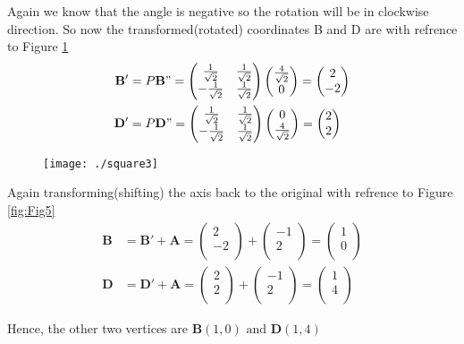 \documentclass[12pt]{article}
\newcommand{\myvec}[1]{\ensuremath{\begin{pmatrix}#1\end{pmatrix}}}
\let\vec\mathbf
\begin{document}
Again we know that the angle is negative so the rotation will be in clockwise direction. So now the transformed(rotated) coordinates B and D are with refrence to Figure \ref{fig:Fig4}
\begin{align*}
\vec{B'} &= P\vec{B"} = \myvec{
\frac{1}{\sqrt{2}} & \frac{1}{\sqrt{2}} \\
-\frac{1}{\sqrt{2}} & \frac{1}{\sqrt{2}}\\
}
\myvec{
 \frac{4}{\sqrt{2}}\\
 0\\
} = 
\myvec{
2 \\
-2\\
}\\
\vec{D'} &= P\vec{D"} = \myvec{
\frac{1}{\sqrt{2}} & \frac{1}{\sqrt{2}} \\
-\frac{1}{\sqrt{2}} & \frac{1}{\sqrt{2}}\\
}
\myvec{
 0\\
 \frac{4}{\sqrt{2}}\\
} = 
\myvec{
2 \\
2 \\
}
\end{align*}

\begin{figure}[!h]
	\begin{center} 
	    \texttt{[image: ./square3]}
	\end{center}
\caption{}
\label{fig:Fig4}
\end{figure}

Again transforming(shifting) the axis back to the original with refrence to Figure \ref{fig:Fig5}
\begin{align*}
\vec{B} &= \vec{B'}+\vec{A} = \myvec{
2 \\
-2\\
}+\myvec{
-1 \\
2\\
} = 
\myvec{
1 \\
0\\
}\\
\vec{D} &= \vec{D'}+\vec{A} = \myvec{
2 \\
2\\
}+\myvec{
-1 \\
2\\
} = 
\myvec{
1 \\
4 \\
}
\end{align*}

Hence, the other two vertices are $\vec{B}(1,0) \text{ and } \vec{D}(1,4)$   
\end{document}
